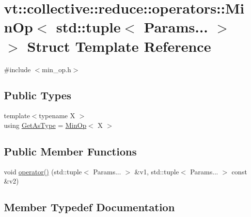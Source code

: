 \hypertarget{structvt_1_1collective_1_1reduce_1_1operators_1_1_min_op_3_01std_1_1tuple_3_01_params_8_8_8_01_4_01_4}{}\section{vt\+:\+:collective\+:\+:reduce\+:\+:operators\+:\+:Min\+Op$<$ std\+:\+:tuple$<$ Params... $>$ $>$ Struct Template Reference}
\label{structvt_1_1collective_1_1reduce_1_1operators_1_1_min_op_3_01std_1_1tuple_3_01_params_8_8_8_01_4_01_4}


{\ttfamily \#include $<$min\+\_\+op.\+h$>$}

\subsection*{Public Types}
\begin{DoxyCompactItemize}
\item 
{\footnotesize template$<$typename X $>$ }\\using \hyperlink{structvt_1_1collective_1_1reduce_1_1operators_1_1_min_op_3_01std_1_1tuple_3_01_params_8_8_8_01_4_01_4_a678d6ca487a177ee18e7bc9ab7d9d922}{Get\+As\+Type} = \hyperlink{structvt_1_1collective_1_1reduce_1_1operators_1_1_min_op}{Min\+Op}$<$ X $>$
\end{DoxyCompactItemize}
\subsection*{Public Member Functions}
\begin{DoxyCompactItemize}
\item 
void \hyperlink{structvt_1_1collective_1_1reduce_1_1operators_1_1_min_op_3_01std_1_1tuple_3_01_params_8_8_8_01_4_01_4_a80a0c395fdb6147263f0a86fb0be7ce2}{operator()} (std\+::tuple$<$ Params... $>$ \&v1, std\+::tuple$<$ Params... $>$ const \&v2)
\end{DoxyCompactItemize}


\subsection{Member Typedef Documentation}
\mbox{\label{structvt_1_1collective_1_1reduce_1_1operators_1_1_min_op_3_01std_1_1tuple_3_01_params_8_8_8_01_4_01_4_a678d6ca487a177ee18e7bc9ab7d9d922}} 
